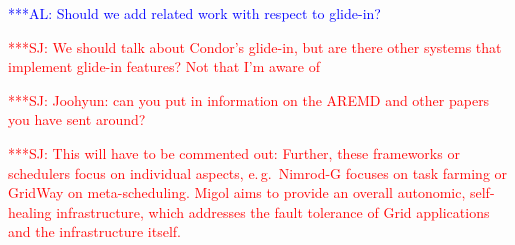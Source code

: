 \documentclass{rspublic}
\newcommand{\alnote}[1]{ {\textcolor{blue} { ***AL: #1 }}}
\newcommand{\jhanote}[1]{ {\textcolor{red} { ***SJ: #1 }}}
\newcommand{\alnote}[1]{}
\newcommand{\jhanote}[1]{}
\begin{document}
\alnote{Should we add related work with respect to glide-in?}

\jhanote{We should talk about Condor's glide-in, but are there other
  systems that implement glide-in features? Not that I'm aware of}

\jhanote{Joohyun: can you put in information on the AREMD and other
  papers you have sent around?}


                                 
\jhanote{This will have to be commented out: Further, these frameworks
  or schedulers focus on individual aspects, e.\,g.\ Nimrod-G focuses
  on task farming or GridWay on meta-scheduling. Migol aims to provide
  an overall autonomic, self-healing infrastructure, which addresses
  the fault tolerance of Grid applications and the infrastructure
  itself.}

\end{document}
